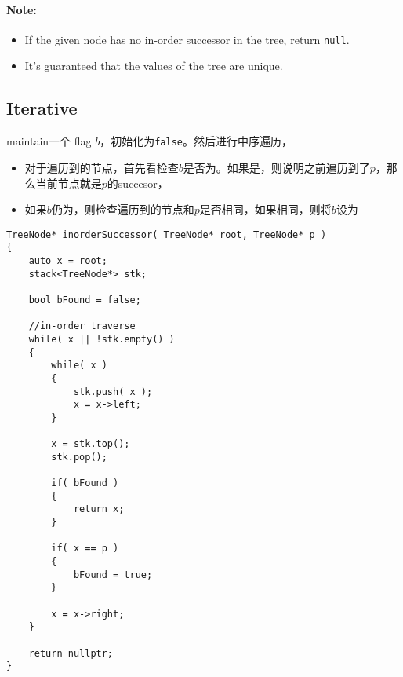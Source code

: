 \paragraph{Note:}
\begin{itemize}
    \item If the given node has no in-order successor in the tree, return \texttt{null}.
    \item It's guaranteed that the values of the tree are unique.
\end{itemize}
\subsection{Iterative}
maintain一个 flag $b$，初始化为\texttt{false}。然后进行中序遍历，
\begin{itemize}
    \item 对于遍历到的节点，首先看检查$b$是否为。如果是，则说明之前遍历到了$p$，那么当前节点就是$p$的succesor，
    \item 如果$b$仍为，则检查遍历到的节点和$p$是否相同，如果相同，则将$b$设为
\end{itemize}
\setcounter{lstlisting}{0}
\begin{lstlisting}[style=customc, caption={Iterative In-order Traverse}]
TreeNode* inorderSuccessor( TreeNode* root, TreeNode* p )
{
    auto x = root;
    stack<TreeNode*> stk;

    bool bFound = false;

    //in-order traverse
    while( x || !stk.empty() )
    {
        while( x )
        {
            stk.push( x );
            x = x->left;
        }

        x = stk.top();
        stk.pop();

        if( bFound )
        {
            return x;
        }

        if( x == p )
        {
            bFound = true;
        }

        x = x->right;
    }

    return nullptr;
}
\end{lstlisting}
